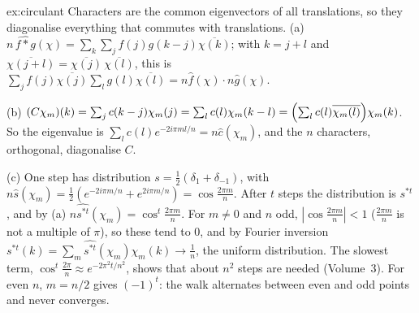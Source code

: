 \begin{solution}{ex:circulant}
\idea Characters are the common eigenvectors of all translations, so they diagonalise everything that commutes with translations.
\writeup (a) $n\,\widehat{f*g}(\chi)=\sum_k\sum_jf(j)g(k-j)\overline{\chi(k)}$; with $k=j+l$ and $\overline{\chi(j+l)}=\overline{\chi(j)}\,\overline{\chi(l)}$, this is $\sum_jf(j)\overline{\chi(j)}\sum_lg(l)\overline{\chi(l)}=n\hat f(\chi)\cdot n\hat g(\chi)$.

(b) $(C\chi_m)(k)=\sum_jc(k-j)\chi_m(j)=\sum_lc(l)\chi_m(k-l)=\Bigl(\sum_lc(l)\overline{\chi_m(l)}\Bigr)\chi_m(k)$. So the eigenvalue is $\sum_lc(l)e^{-2i\pi ml/n}=n\hat c(\chi_m)$, and the $n$ characters, orthogonal, diagonalise $C$.

(c) One step has distribution $s=\frac12(\delta_1+\delta_{-1})$, with $n\hat s(\chi_m)=\frac12(e^{-2i\pi m/n}+e^{2i\pi m/n})=\cos\frac{2\pi m}n$. After $t$ steps the distribution is $s^{*t}$, and by (a) $n\widehat{s^{*t}}(\chi_m)=\cos^t\frac{2\pi m}n$. For $m\ne0$ and $n$ odd, $|\cos\frac{2\pi m}n|<1$ ($\frac{2\pi m}n$ is not a multiple of $\pi$), so these tend to $0$, and by Fourier inversion $s^{*t}(k)=\sum_m\widehat{s^{*t}}(\chi_m)\chi_m(k)\to\frac1n$, the uniform distribution. The slowest term, $\cos^t\frac{2\pi}n\approx e^{-2\pi^2t/n^2}$, shows that about $n^2$ steps are needed (Volume~3). For even $n$, $m=n/2$ gives $(-1)^t$: the walk alternates between even and odd points and never converges.
\end{solution}

